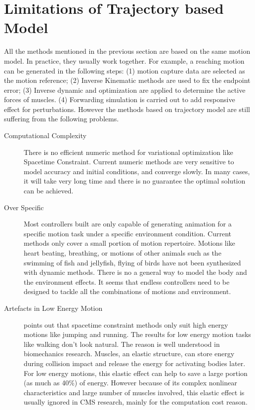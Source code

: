 \section{Limitations of Trajectory based Model}
\label{sec:limitation}
All the methods mentioned in the previous section are based on the same motion model.
In practice, they usually work together. 
For example, a reaching motion can be generated in the following steps: 
(1) motion capture data are selected as the motion reference; 
(2) Inverse Kinematic methods are used to fix the endpoint error; 
(3) Inverse dynamic and optimization are applied to determine the active forces of muscles.
(4) Forwarding simulation is carried out to add responsive effect for perturbations. 
However the methods based on trajectory model are still suffering from the following problems.
\begin{description}
\item [Computational Complexity]
There is no efficient numeric method for variational optimization like Spacetime Constraint. 
Current numeric methods are very sensitive to model accuracy and initial conditions, and converge slowly. 
In many cases, it will take very long time and there is no guarantee the optimal solution can be achieved.
\item [Over Specific]
Most controllers built are only capable of generating animation for a specific motion task under a specific environment condition. 
Current methods only cover a small portion of motion repertoire.
Motions like heart beating, breathing, or motions of other animals such as the swimming of fish and jellyfish, flying of birds have not been synthesized with dynamic methods. 
There is no a general way to model the body and the environment effects. 
It seems that endless controllers need to be designed to tackle all  the combinations of motions and environment.
\item [Artefacts in Low Energy Motion]
\citet{Liu2005} points out that spacetime constraint methods only suit high energy motions like jumping and running.
The results for low energy motion tasks like walking don't look natural. 
The reason is well understood in biomechanics research. 
Muscles, an elastic structure, can store energy during collision impact and release the energy for activating bodies later. 
For low energy motions, this elastic effect can help to save a large portion (as much as 40\%) of energy. 
However because of its complex nonlinear characteristics and large number of muscles involved, this elastic effect is usually ignored in CMS research, mainly for the computation cost reason.
\end{description}

